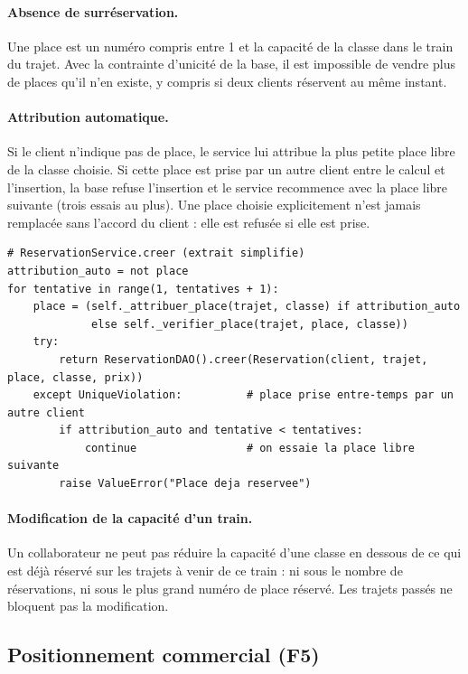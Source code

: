 \documentclass[11pt,a4paper]{article}
\begin{document}
\paragraph{Absence de surréservation.}
Une place est un numéro compris entre 1 et la capacité de la classe dans le train du trajet. Avec
la contrainte d'unicité de la base, il est impossible de vendre plus de places qu'il n'en existe,
y compris si deux clients réservent au même instant.

\paragraph{Attribution automatique.}
Si le client n'indique pas de place, le service lui attribue la plus petite place libre de la
classe choisie. Si cette place est prise par un autre client entre le calcul et l'insertion, la
base refuse l'insertion et le service recommence avec la place libre suivante (trois essais au
plus). Une place choisie explicitement n'est jamais remplacée sans l'accord du client : elle est
refusée si elle est prise.

\begin{lstlisting}
# ReservationService.creer (extrait simplifie)
attribution_auto = not place
for tentative in range(1, tentatives + 1):
    place = (self._attribuer_place(trajet, classe) if attribution_auto
             else self._verifier_place(trajet, place, classe))
    try:
        return ReservationDAO().creer(Reservation(client, trajet, place, classe, prix))
    except UniqueViolation:          # place prise entre-temps par un autre client
        if attribution_auto and tentative < tentatives:
            continue                 # on essaie la place libre suivante
        raise ValueError("Place deja reservee")
\end{lstlisting}

\paragraph{Modification de la capacité d'un train.}
Un collaborateur ne peut pas réduire la capacité d'une classe en dessous de ce qui est déjà réservé
sur les trajets à venir de ce train : ni sous le nombre de réservations, ni sous le plus grand
numéro de place réservé. Les trajets passés ne bloquent pas la modification.

\subsection{Positionnement commercial (F5)}
\end{document}
